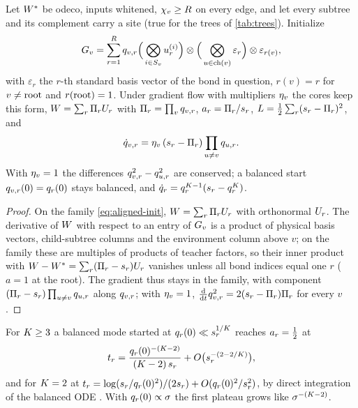 \begin{proposition}\label{prop:aligned}
  \proven{}  Let $W^{*}$ be odeco, inputs
  whitened, $\chi_{v}\ge R$ on every edge, and let every subtree and its complement carry a site
  (true for the trees of \cref{tab:trees}). Initialize
  \begin{equation}\label{eq:aligned-init}
    G_{v}=\sum_{r=1}^{R}q_{v,r}\Big(\bigotimes_{i\in S_{v}}u_{r}^{(i)}\Big)\otimes
    \Big(\bigotimes_{u\in\mathrm{ch}(v)}\varepsilon_r\Big)\otimes\varepsilon_{r(v)},
  \end{equation}
  with $\varepsilon_r$ the $r$-th standard basis vector of the bond in question, $r(v)=r$ for
  $v\ne\mathrm{root}$ and $r(\mathrm{root})=1$. Under gradient flow with multipliers $\eta_{v}$ the cores keep this
  form, $W=\sum_r\Pi_{r}U_{r}$ with $\Pi_{r}=\prod_vq_{v,r}$, $a_{r}=\Pi_{r}/s_{r}$,
  $L=\tfrac12\sum_r(s_{r}-\Pi_{r})^2$, and
  \begin{equation}\label{eq:aligned-ode}
    \dot q_{v,r}=\eta_{v}\,(s_{r}-\Pi_{r})\prod_{u\ne v}q_{u,r}.
  \end{equation}
  With $\eta_{v}=1$ the differences $q_{v,r}^2-q_{u,r}^2$ are conserved; a balanced start
  $q_{v,r}(0)=q_r(0)$ stays balanced, and $\dot q_r=q_r^{K-1}(s_{r}-q_r^{K})$.
\end{proposition}
\begin{proof}
  On the family \eqref{eq:aligned-init}, $W=\sum_r\Pi_{r}U_{r}$ with orthonormal $U_{r}$. The
  derivative of $W$ with respect to an entry of $G_{v}$ is a product of physical basis vectors,
  child-subtree columns and the environment column above $v$; on the family these are multiples of
  products of teacher factors, so their inner product with $W-W^{*}=\sum_r(\Pi_{r}-s_{r})U_{r}$
  vanishes unless all bond indices equal one $r$ ($a=1$ at the root). The gradient thus stays in the
  family, with component $(\Pi_{r}-s_{r})\prod_{u\ne v}q_{u,r}$ along $q_{v,r}$; with
  $\eta_{v}=1$, $\frac{\mathrm{d}}{\mathrm{d} t}q_{v,r}^2=2(s_{r}-\Pi_{r})\Pi_{r}$ for every $v$.
\end{proof}

For $K\ge3$ a balanced mode started at $q_r(0)\ll s_{r}^{1/K}$ reaches $a_{r}=\frac12$ at
\begin{equation}\label{eq:aligned-escape}
  t_r=\frac{q_r(0)^{-(K-2)}}{(K-2)\,s_{r}}+O\big(s_{r}^{-(2-2/K)}\big),
\end{equation}
and for $K=2$ at $t_r=\log(s_{r}/q_r(0)^2)/(2s_{r})+O(q_r(0)^2/s_{r}^2)$, by direct integration
of the balanced ODE \proven. With $q_r(0)\propto\sigma$ the first plateau grows like
$\sigma^{-(K-2)}$.

